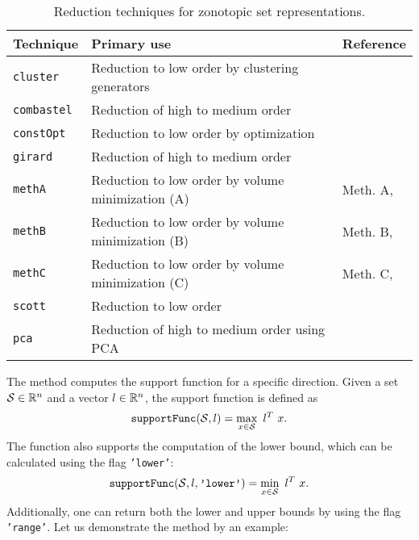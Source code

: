 \begin{table}[h]
	\caption{Reduction techniques for zonotopic set representations.}
	\centering
	\label{tab:zono_reduction}
	\begin{tabular}{lll}
		\toprule
		\textbf{Technique} & \textbf{Primary use} & \textbf{Reference} \\
		\midrule
		\texttt{cluster} & Reduction to low order by clustering generators & \cite[Sec.~III.B]{Kopetzki2017} \\
		\texttt{combastel} & Reduction of high to medium order & \cite[Sec.~3.2]{Combastel2003} \\
		\texttt{constOpt} & Reduction to low order by optimization & \cite[Sec.~III.D]{Kopetzki2017} \\
		\texttt{girard} & Reduction of high to medium order & \cite[Sec. ~.4]{Girard2005} \\
		\texttt{methA} & Reduction to low order by volume minimization (A) & Meth. A, \cite[Sec.~2.5.5]{Althoff2010a} \\
		\texttt{methB} & Reduction to low order by volume minimization (B) & Meth. B, \cite[Sec.~2.5.5]{Althoff2010a} \\
		\texttt{methC} & Reduction to low order by volume minimization (C) & Meth. C, \cite[Sec.~2.5.5]{Althoff2010a} \\
		\texttt{scott} & Reduction to low order  & \cite[Appendix]{Scott2016} \\
		\texttt{pca} & Reduction of high to medium order using PCA & \cite[Sec.~III.A]{Kopetzki2017} \\
		\bottomrule
	\end{tabular}
\end{table}



The method  computes the support function for a specific direction. Given a set $\mathcal{S} \in \mathbb{R}^n$ and a vector $l \in \mathbb{R}^n$, the support function is defined as
\begin{equation*}
	{\normalfont \texttt{supportFunc}}(\mathcal{S},l) = \max_{x \in \mathcal{S}} ~l^T~x.
\end{equation*}
The function also supports the computation of the lower bound, which can be calculated using the flag \texttt{'lower'}:
\begin{equation*}
	{\normalfont \texttt{supportFunc}}(\mathcal{S},l,\texttt{'lower'}) = \min_{x \in \mathcal{S}} ~l^T~x.
\end{equation*}
Additionally, one can return both the lower and upper bounds by using the flag \texttt{'range'}.
Let us demonstrate the method  by an example:

